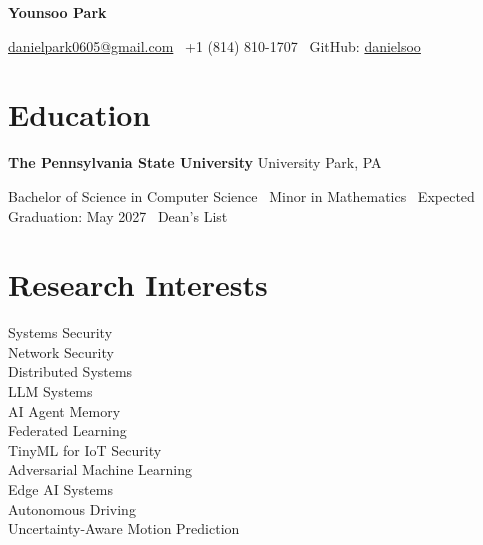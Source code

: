 \documentclass[11pt,a4paper]{article}
\begin{document}

\begin{center}

{\LARGE \textbf{Younsoo Park}}

\vspace{0.3em}

\href{mailto:danielpark0605@gmail.com}{danielpark0605@gmail.com} \
+1 (814) 810-1707 \
GitHub: \href{https://github.com/danielsoo}{danielsoo}

\end{center}


\section*{Education}

\textbf{The Pennsylvania State University} \hfill University Park, PA

Bachelor of Science in Computer Science \
Minor in Mathematics \
Expected Graduation: May 2027 \
Dean's List


\section*{Research Interests}

Systems Security \\
Network Security \\
Distributed Systems \\
LLM Systems \\
AI Agent Memory \\
Federated Learning \\
TinyML for IoT Security \\
Adversarial Machine Learning \\
Edge AI Systems \\
Autonomous Driving \\
Uncertainty-Aware Motion Prediction

\end{document}
